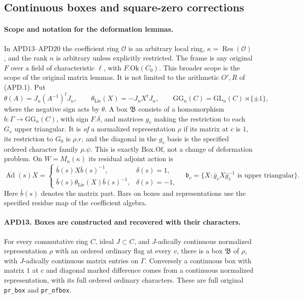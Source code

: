 \subsection{Continuous boxes and square-zero corrections}

\paragraph{Scope and notation for the deformation lemmas.}
In APD13--APD20 the coefficient ring \(\mathcal O\) is an
arbitrary local ring, \(\kappa=\operatorname{Res}(\mathcal O)\),
and the rank \(n\) is arbitrary unless explicitly restricted.
The frame is any original \(F\) over a field of characteristic
\(\ell\), with \(F.\mathrm{Ok}(C_0)\).  This broader scope is
the scope of the original matrix lemmas.  It is not limited to
the arithmetic \(O',R\) of (APD.1).
Put
\[
 \theta(A)=J_n(A^{-1})^tJ_n,\qquad
 \theta_{\mathrm{Lie}}(X)=-J_nX^tJ_n,
 \qquad \mathrm{GG}_n(C)=\mathrm{GL}_n(C)\rtimes\{\pm1\},
                                                               \tag{APD.24}
\]
where the negative sign acts by \(\theta\).  A box
\(\mathfrak B\) consists of a homomorphism
\(b:\Gamma\to\mathrm{GG}_n(C)\), with sign \(F.\delta\),
and matrices \(g_v\) making the restriction to each \(G_v\)
upper triangular.  It is \emph{of} a normalized representation
\(\rho\) if its matrix at \(c\) is \(1\), its restriction
to \(G_0\) is \(\rho.r\), and the diagonal in the \(g_v\)
basis is the specified ordered character family \(\rho.\psi\).
This is exactly \(\mathrm{Box.Of}\), not a change of deformation
problem.  On \(W=M_n(\kappa)\) its residual adjoint action is
\[
 \overline{\operatorname{Ad}}(s)X=
 \begin{cases}
  \bar b(s)X\bar b(s)^{-1},&\delta(s)=1,\\
  \bar b(s)\theta_{\mathrm{Lie}}(X)\bar b(s)^{-1},&\delta(s)=-1,
 \end{cases}
 \quad
 \mathfrak b_v=\{X:\bar g_vX\bar g_v^{-1}
                                    \text{ is upper triangular}\}.
                                                               \tag{APD.25}
\]
Here \(\bar b(s)\) denotes the matrix part.  Bars on boxes
and representations use the specified residue map of the
coefficient algebra.

\paragraph{APD13. Boxes are constructed and recovered with their characters.}
\label{claim:APD13}
For every commutative ring \(C\), ideal \(J\subset C\), and
\(J\)-adically continuous normalized representation \(\rho\)
with an ordered ordinary flag at every \(v\), there is a box
\(\mathfrak B\) of \(\rho\), with \(J\)-adically continuous
matrix entries on \(\Gamma\).  Conversely a continuous box
with matrix \(1\) at \(c\) and diagonal marked difference
comes from a continuous normalized representation, with its full
ordered ordinary characters.  These are full original
\texttt{pr\_box} and \texttt{pr\_ofbox}.

